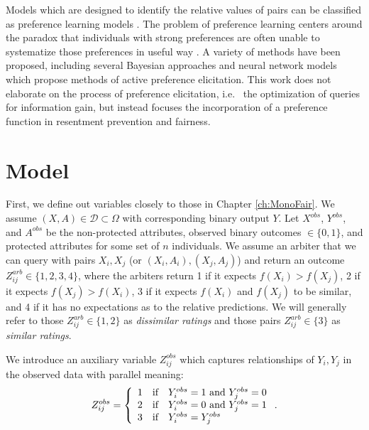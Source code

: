     Models which are designed to identify the relative values of pairs can be classified as preference learning models \citep{peters2018scalable}.  The problem of preference learning centers around the paradox that individuals with strong preferences are often unable to systematize those preferences in useful way  \citep{lichtenstein2006construction}.  A variety of methods have been proposed, including several Bayesian approaches \citep{peters2018scalable,guo2010gaussian} and neural network models  \citep{duman2019intelligent, khannoussi2019integrating} which propose methods of active preference elicitation.  This work does not elaborate on the process of preference elicitation, i.e.~ the optimization of queries for information gain, but instead focuses the incorporation of a preference function in resentment prevention and fairness.
    

\section{Model}\label{sec:softmono_model}

    First, we define out variables closely to those in Chapter \ref{ch:MonoFair}.  We assume $(X, A) \in \mathcal{D} \subset \Omega$ with corresponding binary output $Y$.  Let $X^{obs}$, $Y^{obs}$, and $A^{obs}$ be the non-protected attributes, observed binary outcomes $\in \{0, 1\}$, and protected attributes for some set of $n$ individuals.  We assume an arbiter that we can query with pairs $X_i, X_j$ (or $(X_i, A_i), (X_j, A_j)$) and return an outcome $Z_{ij}^{arb} \in \{1, 2, 3, 4\}$, where the arbiters return 1 if it expects $f(X_i) > f(X_j)$, 2 if it expects $f(X_j) > f(X_i)$, 3 if it expects $f(X_i)$ and $f(X_j)$ to be similar, and 4 if it has no expectations as to the relative predictions.  We will generally refer to those $Z_{ij}^{arb} \in \{1, 2\}$ as \emph{dissimilar ratings} and those pairs $Z_{ij}^{arb} \in \{3\}$ as \emph{similar ratings}.
    
    We introduce an auxiliary variable $Z_{ij}^{obs}$ which captures relationships of $Y_i, Y_j$ in the observed data with parallel meaning:
    $$ Z_{ij}^{obs} = \left\{ \begin{array}{l c l}
        1 & \mbox{if} & Y_i^{obs} = 1 \mbox{~and~} Y_j^{obs} = 0 \\
        2 & \mbox{if} & Y_i^{obs} = 0 \mbox{~and~} Y_j^{obs} = 1 \\
        3 & \mbox{if} & Y_i^{obs} = Y_j^{obs}
    \end{array}\right. .$$
    
